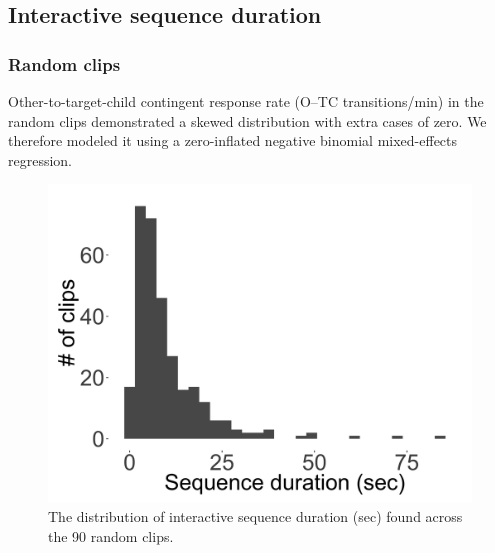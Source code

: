 \documentclass[floatsintext,man]{apa6}
\theoremstyle{definition}
\theoremstyle{definition}
\theoremstyle{definition}
\theoremstyle{remark}
\begin{document}
\FloatBarrier

\subsection{Interactive sequence duration}\label{models-seqdur}

\subsubsection{Random clips}\label{models-seqdur-random}

Other-to-target-child contingent response rate (O--TC transitions/min)
in the random clips demonstrated a skewed distribution with extra cases
of zero. We therefore modeled it using a zero-inflated negative binomial
mixed-effects regression.

\FloatBarrier

\begin{figure}[H]

{\centering \includegraphics[width=0.4\linewidth]{www/seqdur_random_distribution} 

}

\caption{The distribution of interactive sequence duration (sec) found across the 90 random clips.}\label{fig:fig25}
\end{figure}

\FloatBarrier
\end{document}
